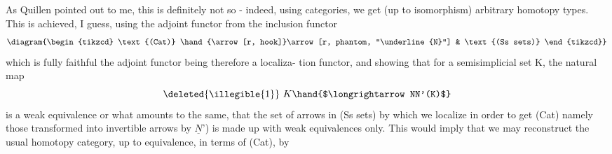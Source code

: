 As Quillen pointed out to me, this is definitely not so - indeed,
using categories, we get (up to isomorphism) arbitrary homotopy types.
This is achieved, I guess, using the  adjoint functor  from the
inclusion functor
\[ \diagram{\begin{tikzcd} \text{(Cat)} \hand{\arrow[r, hook]}\arrow[r, phantom, "\underline{N}"] & \text{(Ss sets)} \end{tikzcd}} \]
which is fully faithful \hand{(}the adjoint functor being therefore a localiza-%
tion functor\hand{)}, and showing that for a semisimplicial set K, the natural
map
\[ \deleted{\illegible{1}}\ K \hand{$\longrightarrow NN'(K)$} \]
is a weak equivalence\hand{,} or what amounts to the same, that the set of
arrows in (Ss sets) by which we localize in order to get (Cat) \hand{(}namely
those transformed into invertible arrows by $\underline{N}$')  is made up with
weak equivalences only. This would imply that we may reconstruct the
usual homotopy category, up to equivalence, in terms of (Cat), by
